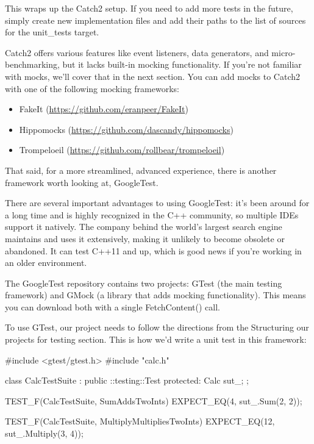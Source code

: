 This wraps up the Catch2 setup. If you need to add more tests in the future, simply create new implementation files and add their paths to the list of sources for the unit\_tests target.

Catch2 offers various features like event listeners, data generators, and micro-benchmarking, but it lacks built-in mocking functionality. If you’re not familiar with mocks, we’ll cover that in the next section. You can add mocks to Catch2 with one of the following mocking frameworks:

\begin{itemize}
\item
FakeIt (\url{https://github.com/eranpeer/FakeIt})

\item
Hippomocks (\url{https://github.com/dascandy/hippomocks})

\item
Trompeloeil (\url{https://github.com/rollbear/trompeloeil})
\end{itemize}

That said, for a more streamlined, advanced experience, there is another framework worth looking at, GoogleTest.


There are several important advantages to using GoogleTest: it’s been around for a long time and is highly recognized in the C++ community, so multiple IDEs support it natively. The company behind the world’s largest search engine maintains and uses it extensively, making it unlikely to become obsolete or abandoned. It can test C++11 and up, which is good news if you’re working in an older environment.

The GoogleTest repository contains two projects: GTest (the main testing framework) and GMock (a library that adds mocking functionality). This means you can download both with a single FetchContent() call.


To use GTest, our project needs to follow the directions from the Structuring our projects for testing section. This is how we’d write a unit test in this framework:


\begin{cpp}
#include <gtest/gtest.h>
#include "calc.h"

class CalcTestSuite : public ::testing::Test {
    protected:
    Calc sut_;
};

TEST_F(CalcTestSuite, SumAddsTwoInts) {
    EXPECT_EQ(4, sut_.Sum(2, 2));
}

TEST_F(CalcTestSuite, MultiplyMultipliesTwoInts) {
    EXPECT_EQ(12, sut_.Multiply(3, 4));
}
\end{cpp}

